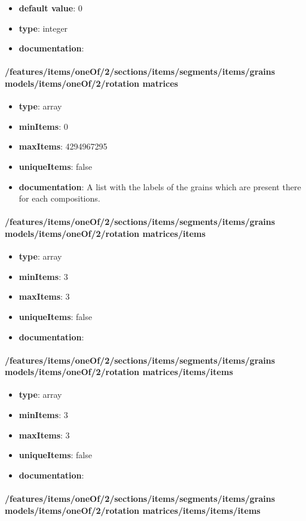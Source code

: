 \begin{itemize}\item {\bf default value}: 0
\item {\bf type}: integer
\item {\bf documentation}: 
\end{itemize}\paragraph{/features/items/oneOf/2/sections/items/segments/items/grains models/items/oneOf/2/rotation matrices}
\begin{itemize}\item {\bf type}: array
\item {\bf minItems}: 0
\item {\bf maxItems}: 4294967295
\item {\bf uniqueItems}: false
\item {\bf documentation}: A list with the labels of the grains which are present there for each compositions.
\end{itemize}\paragraph{/features/items/oneOf/2/sections/items/segments/items/grains models/items/oneOf/2/rotation matrices/items}
\begin{itemize}\item {\bf type}: array
\item {\bf minItems}: 3
\item {\bf maxItems}: 3
\item {\bf uniqueItems}: false
\item {\bf documentation}: 
\end{itemize}\paragraph{/features/items/oneOf/2/sections/items/segments/items/grains models/items/oneOf/2/rotation matrices/items/items}
\begin{itemize}\item {\bf type}: array
\item {\bf minItems}: 3
\item {\bf maxItems}: 3
\item {\bf uniqueItems}: false
\item {\bf documentation}: 
\end{itemize}\paragraph{/features/items/oneOf/2/sections/items/segments/items/grains models/items/oneOf/2/rotation matrices/items/items/items}
